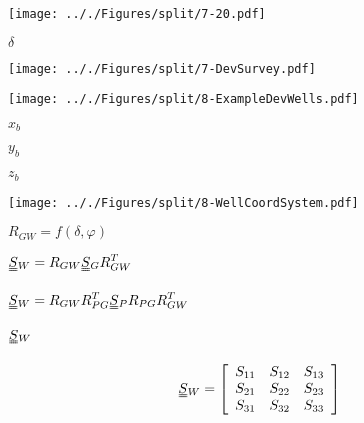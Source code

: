 \documentclass[onecolumn,11pt]{report}
\def\lthtmlcheckvsize{\ifdim\ht\sizebox<\vsize 
  \ifdim\wd\sizebox<\hsize\expandafter\hfill\fi \expandafter\vfill
  \else\expandafter\vss\fi}%
\begin{document}
{\newpage\clearpage
{}%
\texttt{[image: .././Figures/split/7-20.pdf]}%
\lthtmlpictureZ
\lthtmlcheckvsize\clearpage}

{\newpage\clearpage
{}%
$ \delta$%
\lthtmlindisplaymathZ
\lthtmlcheckvsize\clearpage}

{\newpage\clearpage
{}%
\texttt{[image: .././Figures/split/7-DevSurvey.pdf]}%
\lthtmlpictureZ
\lthtmlcheckvsize\clearpage}

{\newpage\clearpage
{}%
\texttt{[image: .././Figures/split/8-ExampleDevWells.pdf]}%
\lthtmlpictureZ
\lthtmlcheckvsize\clearpage}

{\newpage\clearpage
{}%
$ x_b$%
\lthtmlindisplaymathZ
\lthtmlcheckvsize\clearpage}

{\newpage\clearpage
{}%
$ y_b$%
\lthtmlindisplaymathZ
\lthtmlcheckvsize\clearpage}

{\newpage\clearpage
{}%
$ z_b$%
\lthtmlindisplaymathZ
\lthtmlcheckvsize\clearpage}

{\newpage\clearpage
{}%
\texttt{[image: .././Figures/split/8-WellCoordSystem.pdf]}%
\lthtmlpictureZ
\lthtmlcheckvsize\clearpage}

{\newpage\clearpage
{}%
$ R_{GW}=f(\delta,\varphi)$%
\lthtmlindisplaymathZ
\lthtmlcheckvsize\clearpage}

{\newpage\clearpage
{}%
$\displaystyle \uuline{S}{}_W =
R_{GW} \uuline{S}{}_G R_{GW}^T$%
\lthtmlindisplaymathZ
\lthtmlcheckvsize\clearpage}

{\newpage\clearpage
{}%
$\displaystyle \uuline{S}{}_W =
R_{GW} R_{PG}^T \uuline{S}{}_P R_{PG} R_{GW}^T$%
\lthtmlindisplaymathZ
\lthtmlcheckvsize\clearpage}

{\newpage\clearpage
{}%
$ \uuline{S}{}_W$%
\lthtmlindisplaymathZ
\lthtmlcheckvsize\clearpage}

{\newpage\clearpage
{}%
\begin{displaymath}\uuline{S}{}_W =
\left[
\begin{array}{ccc}
S_{11} & S_{12} & S_{13} \\
S_{21} & S_{22} & S_{23} \\
S_{31} & S_{32} & S_{33} \\
\end{array}
\right]\end{displaymath}%
\lthtmldisplayZ
\lthtmlcheckvsize\clearpage}
\end{document}
